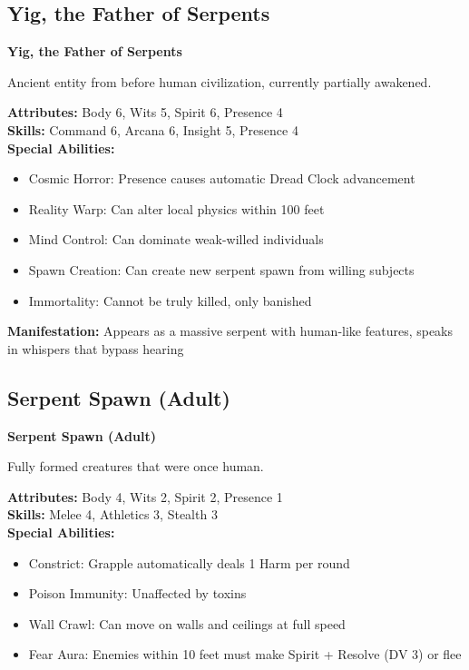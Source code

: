 \documentclass[12pt,twoside]{article}
\newenvironment{npcbox}[1]{
  \begin{mdframed}[
    linewidth=1pt,
    linecolor=dungeongray,
    backgroundcolor=white,
    innertopmargin=5pt,
    innerbottommargin=5pt,
    innerrightmargin=5pt,
    innerleftmargin=5pt
  ]
  \textbf{#1}
}{\end{mdframed}}
\begin{document}
\subsection{Yig, the Father of Serpents}

\begin{npcbox}{Yig, the Father of Serpents}
Ancient entity from before human civilization, currently partially awakened.

\textbf{Attributes:} Body 6, Wits 5, Spirit 6, Presence 4 \\
\textbf{Skills:} Command 6, Arcana 6, Insight 5, Presence 4 \\
\textbf{Special Abilities:}
\begin{itemize}
  \item Cosmic Horror: Presence causes automatic Dread Clock advancement
  \item Reality Warp: Can alter local physics within 100 feet
  \item Mind Control: Can dominate weak-willed individuals
  \item Spawn Creation: Can create new serpent spawn from willing subjects
  \item Immortality: Cannot be truly killed, only banished
\end{itemize}
\textbf{Manifestation:} Appears as a massive serpent with human-like features, speaks in whispers that bypass hearing
\end{npcbox}

\subsection{Serpent Spawn (Adult)}

\begin{npcbox}{Serpent Spawn (Adult)}
Fully formed creatures that were once human.

\textbf{Attributes:} Body 4, Wits 2, Spirit 2, Presence 1 \\
\textbf{Skills:} Melee 4, Athletics 3, Stealth 3 \\
\textbf{Special Abilities:}
\begin{itemize}
  \item Constrict: Grapple automatically deals 1 Harm per round
  \item Poison Immunity: Unaffected by toxins
  \item Wall Crawl: Can move on walls and ceilings at full speed
  \item Fear Aura: Enemies within 10 feet must make Spirit + Resolve (DV 3) or flee
\end{itemize}
\end{npcbox}
\end{document}
